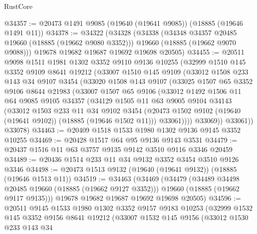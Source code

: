 \begin{lexlean}{RustCore}
\begin{coremodule}
@34357 := @20473 @1491 @9085 (@19640 (@19641 @9085)) (@18885 (@19646 @1491 @11))
@34378 := @34322
    (@34328
      (@34338
        (@34348 @34357 @20485 @19660 (@18885 (@19662 @9080 @3352)))
        @19660
        (@18885 (@19662 @9070 @9088)))
      @19678
      @19682
      @19687
      @19692
      @19698
      @20505)
@34455 := @20511
    @9098
    @1511
    @1981
    @1302
    @3352
    @9110
    @9136
    @10255
    (@32999
      @1510
      @145
      @3352
      @9109
      @8641
      @19212
      (@33007
        @1510
        @145
        @9109
        (@33012
          @1508
          @233
          @143
          @34
          @9107
          @3454
          (@33020
            @1508
            @143
            @9107
            (@33025
              @1507
              @65
              @3352
              @9106
              @8644
              @21983
              (@33007
                @1507
                @65
                @9106
                (@33012
                  @1492
                  @1506
                  @11
                  @64
                  @9085
                  @9105
                  @34357
                  (@34129
                    @1505
                    @11
                    @63
                    @9005
                    @9104
                    @34143
                    (@33012
                      @1503
                      @233
                      @11
                      @34
                      @9102
                      @3454
                      (@20473 @1502 @9102 (@19640 (@19641 @9102)) (@18885 (@19646 @1502 @11)))
                      @33061))))
              @33069))
          @33061))
      @33078)
@34463 := @20409 @1518 @1533 @1980 @1302 @9136 @9145 @3352 @10255
@34469 := @20428 @1517 @64 @95 @9136 @9143 @3531
@34479 := @20437 @1516 @11 @63 @3757 @9135 @9142 @3510 @9116 @3346 @20459
@34489 := @20436 @1514 @233 @11 @34 @9132 @3352 @3454 @3510 @9126 @3346
@34498 := @20473 @1513 @9132 (@19640 (@19641 @9132)) (@18885 (@19646 @1513 @11))
@34519 := @34463
    (@34469
      (@34479
        (@34489 @34498 @20485 @19660 (@18885 (@19662 @9127 @3352)))
        @19660
        (@18885 (@19662 @9117 @9135)))
      @19678
      @19682
      @19687
      @19692
      @19698
      @20505)
@34596 := @20511
    @9145
    @1533
    @1980
    @1302
    @3352
    @9157
    @9183
    @10253
    (@32999
      @1532
      @145
      @3352
      @9156
      @8641
      @19212
      (@33007
        @1532
        @145
        @9156
        (@33012
          @1530
          @233
          @143
          @34

\end{coremodule}
\end{lexlean}
